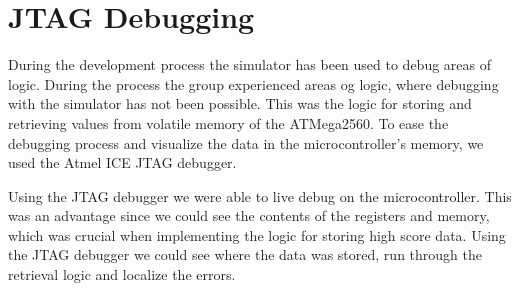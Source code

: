 \section{JTAG Debugging}
	During the development process the simulator has been used to debug areas of logic. During the process the group experienced areas og logic, where debugging with the simulator has not been possible. This was the logic for storing and retrieving values from volatile memory of the ATMega2560. To ease the debugging process and visualize the data in the microcontroller's memory, we used the Atmel ICE JTAG debugger. 
	
	Using the JTAG debugger we were able to live debug on the microcontroller. This was an advantage since we could see the contents of the registers and memory, which was crucial when implementing the logic for storing high score data. Using the JTAG debugger we could see where the data was stored, run through the retrieval logic and localize the errors. 
	